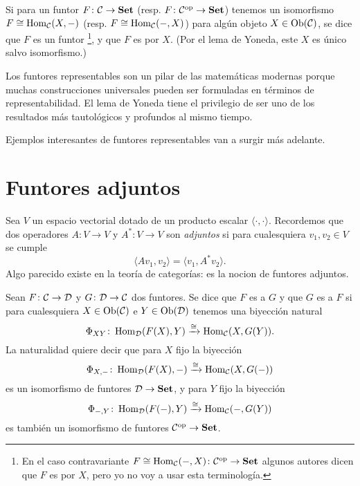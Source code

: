 \documentclass{article}
\numberwithin{equation}{section}
\theoremstyle{definition}
\begin{document}
\begin{definicion}
  Si para un funtor $F\colon \mathcal{C} \to \text{\bf Set}$ (resp.
  $F\colon \mathcal{C}^\mathrm{op} \to \text{\bf Set}$) tenemos un isomorfismo
  $F \cong \operatorname{Hom}_\mathcal{C} (X,-)$ (resp. $F \cong \operatorname{Hom}_\mathcal{C} (-,X)$) para
  algún objeto $X \in \operatorname{Ob}(\mathcal{C})$, se dice que $F$ es un funtor
  \footnote{En el caso contravariante
    $F \cong \operatorname{Hom}_\mathcal{C} (-,X)\colon \mathcal{C}^\mathrm{op} \to \text{\bf Set}$
    algunos autores dicen que $F$ es  por $X$, pero yo no
    voy a usar esta terminología.}, y que $F$ es  por
  $X$. (Por el lema de Yoneda, este $X$ es único salvo isomorfismo.)
\end{definicion}

Los funtores representables son un pilar de las matemáticas modernas porque
muchas construcciones universales pueden ser formuladas en términos de
representabilidad. El lema de Yoneda tiene el privilegio de ser uno de los
resultados más tautológicos y profundos al mismo tiempo.

Ejemplos interesantes de funtores representables van a surgir más adelante.


\section{Funtores adjuntos}


Sea $V$ un espacio vectorial dotado de un producto escalar
$\langle \cdot,\cdot \rangle$. Recordemos que dos operadores $A\colon V\to V$ y
$A^*\colon V\to V$ son \emph{adjuntos} si para cualesquiera $v_1,v_2 \in V$ se
cumple
$$\langle A v_1, v_2\rangle = \langle v_1, A^* v_2\rangle.$$
Algo parecido existe en la teoría de categorías: es la nocion de funtores adjuntos.

\begin{definicion}
  Sean $F\colon \mathcal{C} \to \mathcal{D}$ y $G\colon \mathcal{D} \to \mathcal{C}$
  dos funtores. Se dice que $F$ es  a $G$ y que
  $G$ es  a $F$ si para cualesquiera
  $X \in \operatorname{Ob} (\mathcal{C})$ e $Y \in \operatorname{Ob} (\mathcal{D})$ tenemos una biyección
  natural
  $$\Phi_{XY}\colon \operatorname{Hom}_\mathcal{D} (F (X), Y) \xrightarrow{\cong} \operatorname{Hom}_\mathcal{C} (X, G (Y)).$$
  La naturalidad quiere decir que para $X$ fijo la biyección
  $$\Phi_{X,-}\colon \operatorname{Hom}_\mathcal{D} (F (X), -) \xrightarrow{\cong} \operatorname{Hom}_\mathcal{C} (X, G (-))$$
  es un isomorfismo de funtores $\mathcal{D} \to \text{\bf Set}$, y para $Y$ fijo la
  biyección
  $$\Phi_{-,Y}\colon \operatorname{Hom}_\mathcal{D} (F (-), Y) \xrightarrow{\cong} \operatorname{Hom}_\mathcal{C} (-, G (Y))$$
  es también un isomorfismo de funtores
  $\mathcal{C}^\mathrm{op} \to \text{\bf Set}$.
\end{definicion}
\end{document}
